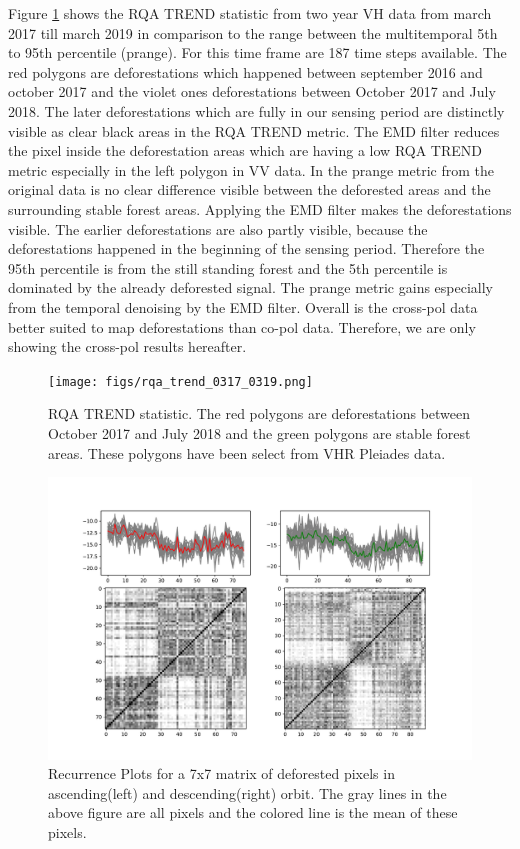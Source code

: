 \documentclass{article}
\begin{document}
Figure \ref{trend} shows the RQA TREND statistic from two year VH data from march 2017 till march 2019 in comparison to the range between the multitemporal 5th to 95th percentile (prange).
For this time frame are 187 time steps available.
The red polygons are deforestations which happened between september 2016 and october 2017 and the violet ones deforestations between October 2017 and July 2018.
The later deforestations which are fully in our sensing period are distinctly visible as clear black areas in the RQA TREND metric.
The EMD filter reduces the pixel inside the deforestation areas which are having a low RQA TREND metric especially in the left polygon in VV data.
In the prange metric from the original data is no clear difference visible between the deforested areas and the surrounding stable forest areas.
Applying the EMD filter makes the deforestations visible.
The earlier deforestations are also partly visible, because the deforestations happened in the beginning of the sensing period.
Therefore the 95th percentile is from the still standing forest and the 5th percentile is dominated by the already deforested signal.
The prange metric gains especially from the temporal denoising by the EMD filter.
Overall is the cross-pol data better suited to map deforestations than co-pol data.
Therefore, we are only showing the cross-pol results hereafter.


\begin{figure}
  \texttt{[image: figs/rqa\_trend\_0317\_0319.png]}
  \caption{RQA TREND statistic.  The red polygons are deforestations between October 2017 and July 2018 and the green polygons are stable forest areas.
  These polygons have been select from VHR Pleiades data.}
  \label{trend}
\end{figure}


\begin{figure}
  \includegraphics[width=\textwidth]{figs/comp_vh_a_d_def.pdf}
  \caption{Recurrence Plots for a 7x7 matrix of deforested pixels in ascending(left) and descending(right) orbit.
           The gray lines in the above figure are all pixels and the colored line is the mean of these pixels.}
  \label{rpdef_a_d}
\end{figure}
\end{document}
